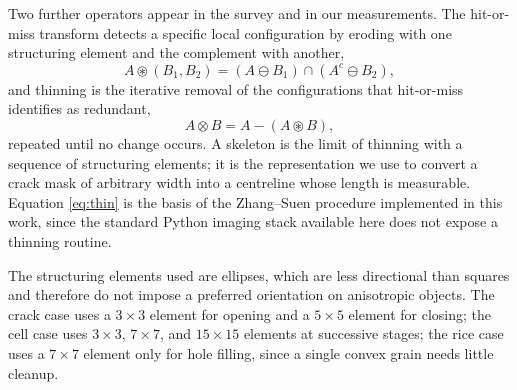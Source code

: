 \documentclass{ieeeaccess}
\begin{document}
Two further operators appear in the survey and in our measurements. The
hit-or-miss transform detects a specific local configuration by eroding with one
structuring element and the complement with another,
\begin{equation}
A\circledast (B_1,B_2)=(A\ominus B_1)\cap(A^c\ominus B_2),
\label{eq:hitmiss}
\end{equation}
and thinning is the iterative removal of the configurations that hit-or-miss
identifies as redundant,
\begin{equation}
A\otimes B=A-(A\circledast B),
\label{eq:thin}
\end{equation}
repeated until no change occurs. A skeleton is the limit of thinning with a
sequence of structuring elements; it is the representation we use to convert a
crack mask of arbitrary width into a centreline whose length is measurable.
Equation \eqref{eq:thin} is the basis of the Zhang--Suen procedure
\cite{gonzalez2018} implemented in this work, since the standard Python imaging
stack available here does not expose a thinning routine.

The structuring elements used are ellipses, which are less directional than
squares and therefore do not impose a preferred orientation on anisotropic
objects. The crack case uses a $3\times3$ element for opening and a
$5\times5$ element for closing; the cell case uses $3\times3$, $7\times7$, and
$15\times15$ elements at successive stages; the rice case uses a $7\times7$
element only for hole filling, since a single convex grain needs little
cleanup.
\end{document}
